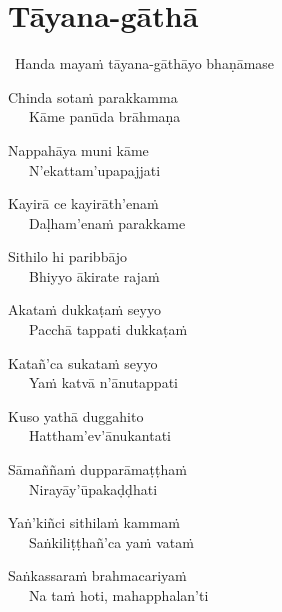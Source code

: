 
\section{Tāyana-gāthā}
\label{tayana-gatha}

\begin{intro}
	\anglebracketleft\ \hspace{-0.5mm}Handa mayaṁ tāyana-gāthāyo bhaṇāmase \hspace{-0.5mm}\anglebracketright\
\end{intro}


\begin{hanging-indent}
Chinda sotaṁ parakkamma\\
Kāme panūda brāhmaṇa
\end{hanging-indent}
\begin{hanging-indent}
Nappahāya muni kāme\\
N'ekattam'upapajjati
\end{hanging-indent}
\begin{hanging-indent}
Kayirā ce kayirāth'enaṁ\\
Daḷham'enaṁ parakkame
\end{hanging-indent}
\begin{hanging-indent}
Sithilo hi paribbājo\\
Bhiyyo ākirate rajaṁ
\end{hanging-indent}
\begin{hanging-indent}
Akataṁ dukkaṭaṁ seyyo\\
Pacchā tappati dukkaṭaṁ
\end{hanging-indent}
\begin{hanging-indent}
Katañ'ca sukataṁ seyyo\\
Yaṁ katvā n'ānutappati
\end{hanging-indent}
\begin{hanging-indent}
Kuso yathā duggahito\\
Hattham'ev'ānukantati
\end{hanging-indent}
\begin{hanging-indent}
Sāmaññaṁ dupparāmaṭṭhaṁ\\
Nirayāy'ūpakaḍḍhati
\end{hanging-indent}
\begin{hanging-indent}
Yaṅ'kiñci sithilaṁ kammaṁ\\
Saṅkiliṭṭhañ'ca yaṁ vataṁ
\end{hanging-indent}
\begin{hanging-indent}
Saṅkassaraṁ brahmacariyaṁ\\
Na taṁ hoti, mahapphalan'ti
\end{hanging-indent}

\clearpage

